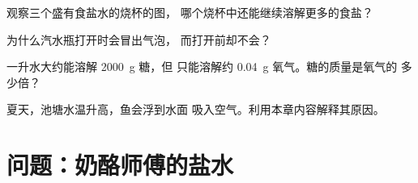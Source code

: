 \begin{exercise}[$\star\star$]\label{exo:g6:solutions-and-solubility:9}
观察三个盛有食盐水的烧杯的图，
哪个烧杯中还能继续溶解更多的食盐？
\end{exercise}

\begin{exercise}[$\star\star$]\label{exo:g6:solutions-and-solubility:10}
为什么汽水瓶打开时会冒出气泡，
而打开前却不会？
\end{exercise}

\begin{exercise}[$\star\star\star$]\label{exo:g6:solutions-and-solubility:11}
一升水大约能溶解 \qty{2000}{g} 糖，但
只能溶解约 \qty{0.04}{g} 氧气。糖的质量是氧气的
多少倍？
\end{exercise}

\begin{exercise}[$\star\star\star$]\label{exo:g6:solutions-and-solubility:12}
夏天，池塘水温升高，鱼会浮到水面
吸入空气。利用本章内容解释其原因。
\end{exercise}

\section{问题：奶酪师傅的盐水}

